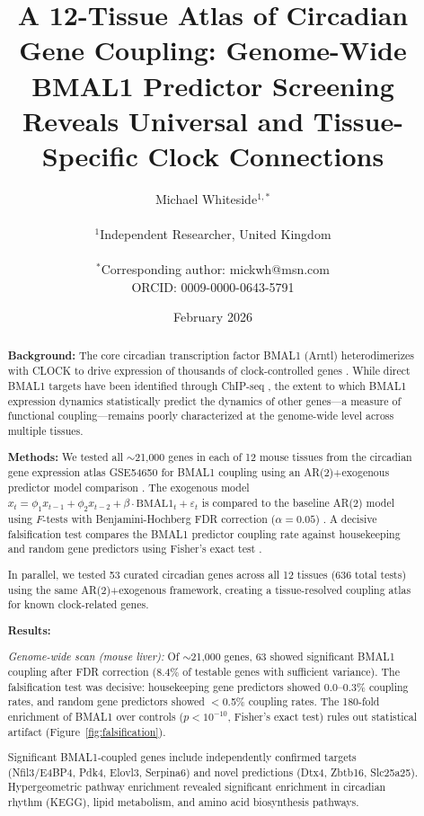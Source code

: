 \documentclass[11pt,letterpaper]{article}
\title{\textbf{A 12-Tissue Atlas of Circadian Gene Coupling: Genome-Wide BMAL1 Predictor Screening Reveals Universal and Tissue-Specific Clock Connections}}
\author{
Michael Whiteside$^{1,*}$ \\
\\
$^1$Independent Researcher, United Kingdom \\
\\
$^*$Corresponding author: mickwh@msn.com \\
ORCID: 0009-0000-0643-5791
}
\date{February 2026}
\begin{document}
\maketitle

\begin{abstract}
\noindent\textbf{Background:} The core circadian transcription factor BMAL1 (Arntl) heterodimerizes with CLOCK to drive expression of thousands of clock-controlled genes \citep{takahashi2017transcriptional}. While direct BMAL1 targets have been identified through ChIP-seq \citep{koike2012transcriptional}, the extent to which BMAL1 expression dynamics statistically predict the dynamics of other genes---a measure of functional coupling---remains poorly characterized at the genome-wide level across multiple tissues.

\noindent\textbf{Methods:} We tested all $\sim$21,000 genes in each of 12 mouse tissues from the circadian gene expression atlas GSE54650 \citep{zhang2014circadian} for BMAL1 coupling using an AR(2)+exogenous predictor model comparison \citep{hamilton1994time}. The exogenous model $x_t = \phi_1 x_{t-1} + \phi_2 x_{t-2} + \beta \cdot \text{BMAL1}_t + \varepsilon_t$ is compared to the baseline AR(2) model using $F$-tests with Benjamini-Hochberg FDR correction ($\alpha = 0.05$) \citep{benjamini1995controlling}. A decisive falsification test compares the BMAL1 predictor coupling rate against housekeeping and random gene predictors using Fisher's exact test \citep{fisher1935logic}.

In parallel, we tested 53 curated circadian genes \citep{panda2002coordinated, ko2006molecular} across all 12 tissues (636 total tests) using the same AR(2)+exogenous framework, creating a tissue-resolved coupling atlas for known clock-related genes.

\noindent\textbf{Results:}

\textit{Genome-wide scan (mouse liver):} Of $\sim$21,000 genes, 63 showed significant BMAL1 coupling after FDR correction (8.4\% of testable genes with sufficient variance). The falsification test was decisive: housekeeping gene predictors showed 0.0--0.3\% coupling rates, and random gene predictors showed $<$0.5\% coupling rates. The 180-fold enrichment of BMAL1 over controls ($p < 10^{-10}$, Fisher's exact test) rules out statistical artifact (Figure~\ref{fig:falsification}).

Significant BMAL1-coupled genes include independently confirmed targets (Nfil3/E4BP4, Pdk4, Elovl3, Serpina6) and novel predictions (Dtx4, Zbtb16, Slc25a25). Hypergeometric pathway enrichment revealed significant enrichment in circadian rhythm (KEGG), lipid metabolism, and amino acid biosynthesis pathways.


\end{abstract}
\end{document}
